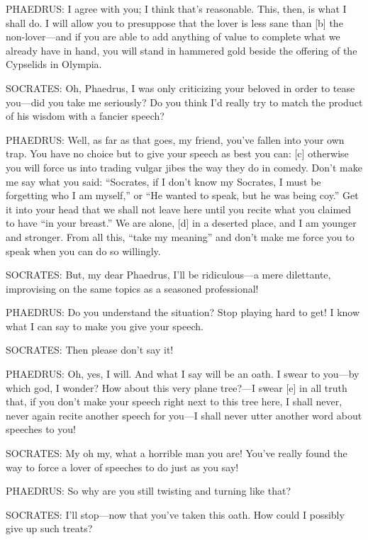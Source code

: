 PHAEDRUS: I agree with you; I think that's reasonable. This, then, is
what I shall do. I will allow you to presuppose that the lover is less
sane than {[}b{]} the non-lover---and if you are able to add anything of
value to complete what we already have in hand, you will stand in
hammered gold beside the offering of the Cypselids in
Olympia.

SOCRATES: Oh, Phaedrus, I was only criticizing your beloved in order to
tease you---did you take me seriously? Do you think I'd really try to
match the product of his wisdom with a fancier speech?

PHAEDRUS: Well, as far as that goes, my friend, you've fallen into your
own trap. You have no choice but to give your speech as best you can:
{[}c{]} otherwise you will force us into trading vulgar jibes the way
they do in comedy. Don't make me say what you said: “Socrates, if I
don't know my Socrates, I must be forgetting who I am myself,” or “He
wanted to speak, but he was being coy.” Get it into your head that we
shall not leave here until you recite what you claimed to have “in your
breast.” We are alone, {[}d{]} in a deserted place, and I am younger and
stronger. From all this, “take my
meaning” and don't
make me force you to speak when you can do so willingly.

SOCRATES: But, my dear Phaedrus, I'll be ridiculous---a mere dilettante,
improvising on the same topics as a seasoned professional!

PHAEDRUS: Do you understand the situation? Stop playing hard to get! I
know what I can say to make you give your speech.

SOCRATES: Then please don't say it!

PHAEDRUS: Oh, yes, I will. And what I say will be an oath. I swear to
you---by which god, I wonder? How about this very plane tree?---I swear
{[}e{]} in all truth that, if you don't make your speech right next to
this tree here, I shall never, never again recite another speech for
you---I shall never utter another word about speeches to you!

SOCRATES: My oh my, what a horrible man you are! You've really found the
way to force a lover of speeches to do just as you say!

PHAEDRUS: So why are you still twisting and turning like that?

SOCRATES: I'll stop---now that you've taken this oath. How could I
possibly give up such treats?

